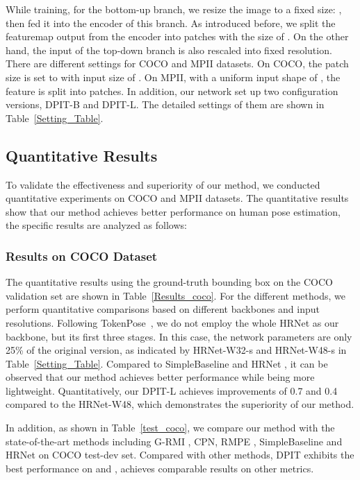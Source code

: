 \documentclass[runningheads]{llncs}
\begin{document}
While training, for the bottom-up branch, we resize the image to a fixed size: , then fed it into the encoder of this branch. As introduced before, we split the featuremap output from the encoder into patches with the size of . On the other hand, the input of the top-down branch is also rescaled into fixed resolution. There are different settings for COCO and MPII datasets. On COCO, the patch size is set to  with input size of . On MPII, with a uniform input shape of , the feature is split into  patches. In addition, our network set up two configuration versions, DPIT-B and DPIT-L. The detailed settings of them are shown in Table~\ref{Setting_Table}.

\subsection{Quantitative Results} \label{sec:eval}
To validate the effectiveness and superiority of our method, we conducted quantitative experiments on COCO and MPII datasets. The quantitative results show that our method achieves better performance on human pose estimation, the specific results are analyzed as follows:

\subsubsection{Results on COCO Dataset}
The quantitative results using the ground-truth bounding box on the COCO validation set are shown in Table~\ref{Results_coco}. For the different methods, we perform quantitative comparisons based on different backbones and input resolutions. Following TokenPose~\cite{Tokenpose2021}, we do not employ the whole HRNet as our backbone, but its first three stages. In this case, the network parameters are only 25\% of the original version, as indicated by HRNet-W32-s and HRNet-W48-s in Table~\ref{Setting_Table}. Compared to SimpleBaseline \cite{simple_baseline2018} and HRNet \cite{HRNet2019}, it can be observed that our method achieves better performance while being more lightweight. Quantitatively, our DPIT-L achieves improvements of 0.7  and 0.4  compared to the HRNet-W48, which demonstrates the superiority of our method.

In addition, as shown in Table~\ref{test_coco}, we compare our method with the state-of-the-art methods including G-RMI \cite{G-RMI2017}, CPN\cite{CPN2018}, RMPE \cite{RMPE2017}, SimpleBaseline \cite{simple_baseline2018} and HRNet \cite{HRNet2019} on COCO test-dev set. Compared with other methods, DPIT exhibits the best performance on  and , achieves comparable results on other metrics.
\end{document}
